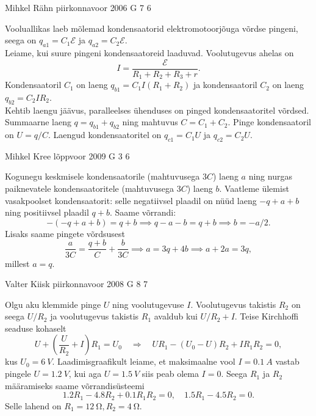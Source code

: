 \documentclass[11pt, twoside]{article}
\begin{document}
{%
{Mihkel Rähn} %
{piirkonnavoor} %
{2006} %
{G 7} %
{6} %
{

\ifSolution
\osa Vooluallikas laeb mõlemad kondensaatorid elektromotoorjõuga võrdse pingeni, seega on $q_{a1} = C_1\mathcal E$ ja $q_{a2} = C_2\mathcal E$.\\
\osa Leiame, kui suure pingeni kondensaatoreid laaduvad. Voolutugevus ahelas
on
\[
I = \frac{\mathcal E}{R_1+R_2+R_3+r}.
\]
Kondensaatoril $C_1$ on laeng $q_{b1} = C_1I(R_1 + R_2)$ ja kondensaatoril $C_2$ on laeng $q_{b2} = C_2IR_2$.\\
\osa Kehtib laengu jäävus, paralleelses ühenduses on pinged kondensaatoritel võrdsed. Summaarne laeng $q = q_{b1} + q_{b2}$ ning mahtuvus $C = C_1 + C_2$. Pinge kondensaatoril on $U = q/C$. Laengud kondensaatoritel on $q_{c1} = C_1U$ ja $q_{c2} = C_2U$. 
\fi
}

{Mihkel Kree} %
{lõppvoor} %
{2009} %
{G 3} %
{6} %
{

\ifSolution
Kogunegu keskmisele kondensaatorile (mahtuvusega $3C$) laeng $a$ ning nurgas paiknevatele kondensaatoritele (mahtuvusega $3C$) laeng $b$. Vaatleme ülemist vasakpoolset kondensaatorit: selle negatiivsel plaadil on nüüd laeng $-q+a+b$ ning positiivsel plaadil $q+b$. Saame võrrandi:
\[-(-q+a+b)=q+b \implies q-a-b=q+b \implies b=-a/2.\]
Lisaks saame pingete võrdsusest
\[\frac{a}{3C}=\frac{q+b}{C}+\frac{b}{3C}\implies a=3q+4b\implies a+2a=3q,\]
millest $a=q$.
\fi
}

{Valter Kiisk} %
{piirkonnavoor} %
{2008} %
{G 8} %
{7} %
{

\ifSolution
Olgu aku klemmide pinge $U$ ning voolutugevuse $I$. Voolutugevus takistis $R_2$ on seega $U/R_2$ ja voolutugevus takistis $R_1$ avaldub kui $U/R_2 + I$. Teise Kirchhoffi seaduse kohaselt 
\[
U+\left(\frac{U}{R_{2}}+I\right) R_{1}=U_{0} \quad \Rightarrow \quad U R_{1}-\left(U_{0}-U\right) R_{2}+I R_{1} R_{2}=0,
\]
kus $U_0 = \SI{6}{V}$. Laadimisgraafikult leiame, et maksimaalne vool $I = \SI{0,1}{A}$ vastab pingele $U = \SI{1,2}{V}$, kui aga $U = \SI{1,5}{V}$ siis peab olema $I = 0$. Seega $R_1$ ja $R_2$ määramiseks saame võrrandisüsteemi 
\[
\num{1,2}R_1 - \num{4,8}R_2 + \num{0,1}R_1R_2 = 0, \quad \num{1,5}R_1 - \num{4,5}R_2 = 0. 
\]
Selle lahend on $R_1 = \SI{12}{\ohm}, R_2 = \SI{4}{\ohm}$.
\fi
}

}
\end{document}
